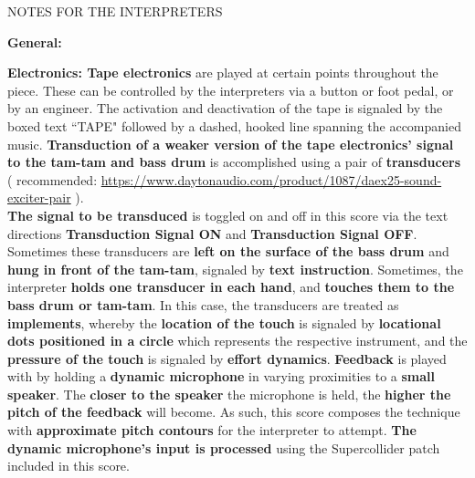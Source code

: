 \documentclass[12pt]{article}
\newcommand*\circled[1]{\tikz[baseline=(char.base)]{
            \node[shape=circle,draw,inner sep=1pt] (char) {#1};}}
\begin{document}
\begin{center}
\huge NOTES FOR THE INTERPRETERS
\end{center}

\begingroup
\textbf{General: \circled{1} } 
\endgroup

\begingroup
\textbf{Electronics: \circled{1} Tape electronics} are played at certain points throughout the piece. These can be controlled by the interpreters via a button or foot pedal, or by an engineer. The activation and deactivation of the tape is signaled by the boxed text ``TAPE" followed by a dashed, hooked line spanning the accompanied music. \textbf{\circled{2} Transduction of a weaker version of the tape electronics' signal to the tam-tam and bass drum} is accomplished using a pair of \textbf{transducers} \\
( recommended: \url{https://www.daytonaudio.com/product/1087/daex25-sound-exciter-pair} ). \\ 
\textbf{The signal to be transduced} is toggled on and off in this score via the text directions \textbf{Transduction Signal ON} and \textbf{Transduction Signal OFF}. Sometimes these transducers are \textbf{left on the surface of the bass drum} and \textbf{hung in front of the tam-tam}, signaled by \textbf{text instruction}. Sometimes, the interpreter \textbf{holds one transducer in each hand}, and \textbf{touches them to the bass drum or tam-tam}. In this case, the transducers are treated as \textbf{implements}, whereby the \textbf{location of the touch} is signaled by \textbf{locational dots positioned in a circle} which represents the respective instrument, and the \textbf{pressure of the touch} is signaled by \textbf{effort dynamics}. \textbf{\circled{3} Feedback} is played with by holding a \textbf{dynamic microphone} in varying proximities to a \textbf{small speaker}. The \textbf{closer to the speaker} the microphone is held, the \textbf{higher the pitch of the feedback} will become. As such, this score composes the technique with \textbf{approximate pitch contours} for the interpreter to attempt. \textbf{The dynamic microphone's input is processed} using the Supercollider patch included in this score. 
\endgroup
\end{document}
